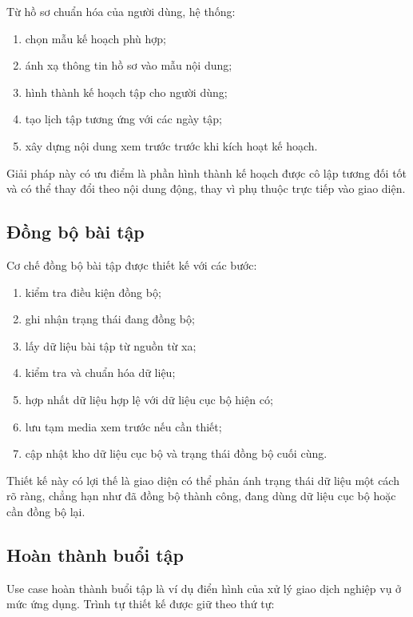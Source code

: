 Từ hồ sơ chuẩn hóa của người dùng, hệ thống:

\begin{enumerate}
    \item chọn mẫu kế hoạch phù hợp;
    \item ánh xạ thông tin hồ sơ vào mẫu nội dung;
    \item hình thành kế hoạch tập cho người dùng;
    \item tạo lịch tập tương ứng với các ngày tập;
    \item xây dựng nội dung xem trước trước khi kích hoạt kế hoạch.
\end{enumerate}

Giải pháp này có ưu điểm là phần hình thành kế hoạch được cô lập tương đối tốt và có thể thay đổi theo nội dung động, thay vì phụ thuộc trực tiếp vào giao diện.

\subsection{Đồng bộ bài tập}

Cơ chế đồng bộ bài tập được thiết kế với các bước:

\begin{enumerate}
    \item kiểm tra điều kiện đồng bộ;
    \item ghi nhận trạng thái đang đồng bộ;
    \item lấy dữ liệu bài tập từ nguồn từ xa;
    \item kiểm tra và chuẩn hóa dữ liệu;
    \item hợp nhất dữ liệu hợp lệ với dữ liệu cục bộ hiện có;
    \item lưu tạm media xem trước nếu cần thiết;
    \item cập nhật kho dữ liệu cục bộ và trạng thái đồng bộ cuối cùng.
\end{enumerate}

Thiết kế này có lợi thế là giao diện có thể phản ánh trạng thái dữ liệu một cách rõ ràng, chẳng hạn như đã đồng bộ thành công, đang dùng dữ liệu cục bộ hoặc cần đồng bộ lại.

\subsection{Hoàn thành buổi tập}

Use case hoàn thành buổi tập là ví dụ điển hình của xử lý giao dịch nghiệp vụ ở mức ứng dụng. Trình tự thiết kế được giữ theo thứ tự:

